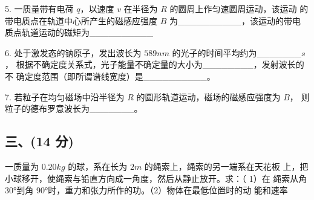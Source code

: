 5. 一质量带有电荷 $q$，以速度 $v$ 在半径为 $R$ 的圆周上作匀速圆周运动，该运动
的带电质点在轨道中心所产生的磁感应强度 $B$ 为__________，该运动的带电
质点轨道运动的磁矩为__________

6. 处于激发态的钠原子，发出波长为 $589nm$ 的光子的时间平均约为_______$s$，
根据不确定度关系式，光子能量不确定量的大小为________，发射波长的不
确定度范围（即所谓谱线宽度）是__________。

7. 若粒子在均匀磁场中沿半径为 $R$ 的圆形轨道运动，磁场的磁感应强度为 $B$，
则粒子的德布罗意波长为_______。
\subsection{三、(14 分)}
一质量为 $0.20kg$ 的球，系在长为 $2m$ 的绳索上，绳索的另一端系在天花板
上，把小球移开，使绳索与铅直方向成一角度，然后从静止放开。求：（ 1）在
绳索从角 30°到角 90°时，重力和张力所作的功。（2）物体在最低位置时的动
能和速率